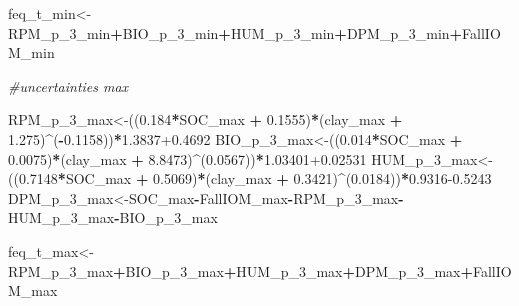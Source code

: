 \documentclass[
  10pt,
  b5paper,
]{book}
\newenvironment{Shaded}{\begin{snugshade}}{\end{snugshade}}
\newcommand{\CommentTok}[1]{\textcolor[rgb]{0.56,0.35,0.01}{\textit{#1}}}
\newcommand{\DecValTok}[1]{\textcolor[rgb]{0.00,0.00,0.81}{#1}}
\newcommand{\FloatTok}[1]{\textcolor[rgb]{0.00,0.00,0.81}{#1}}
\newcommand{\NormalTok}[1]{#1}
\newcommand{\OperatorTok}[1]{\textcolor[rgb]{0.81,0.36,0.00}{\textbf{#1}}}
\newcommand{\StringTok}[1]{\textcolor[rgb]{0.31,0.60,0.02}{#1}}
\begin{document}
\begin{Shaded}
\begin{Highlighting}[]
{\NormalTok{feq_t_min<-RPM_p_}\DecValTok{3}\NormalTok{_min}\OperatorTok{+}\NormalTok{BIO_p_}\DecValTok{3}\NormalTok{_min}\OperatorTok{+}\NormalTok{HUM_p_}\DecValTok{3}\NormalTok{_min}\OperatorTok{+}\NormalTok{DPM_p_}\DecValTok{3}\NormalTok{_min}\OperatorTok{+}\NormalTok{FallIOM_min}

\CommentTok{#uncertainties max}

\NormalTok{RPM_p_}\DecValTok{3}\NormalTok{_max<-((}\FloatTok{0.184}\OperatorTok{*}\NormalTok{SOC_max }\OperatorTok{+}\StringTok{ }\FloatTok{0.1555}\NormalTok{)}\OperatorTok{*}\NormalTok{(clay_max }\OperatorTok{+}\StringTok{ }\FloatTok{1.275}\NormalTok{)}\OperatorTok{^}\NormalTok{(}\OperatorTok{-}\FloatTok{0.1158}\NormalTok{))}\OperatorTok{*}\FloatTok{1.3837+0.4692}
\NormalTok{BIO_p_}\DecValTok{3}\NormalTok{_max<-((}\FloatTok{0.014}\OperatorTok{*}\NormalTok{SOC_max }\OperatorTok{+}\StringTok{ }\FloatTok{0.0075}\NormalTok{)}\OperatorTok{*}\NormalTok{(clay_max }\OperatorTok{+}\StringTok{ }\FloatTok{8.8473}\NormalTok{)}\OperatorTok{^}\NormalTok{(}\FloatTok{0.0567}\NormalTok{))}\OperatorTok{*}\FloatTok{1.03401+0.02531}
\NormalTok{HUM_p_}\DecValTok{3}\NormalTok{_max<-((}\FloatTok{0.7148}\OperatorTok{*}\NormalTok{SOC_max }\OperatorTok{+}\StringTok{ }\FloatTok{0.5069}\NormalTok{)}\OperatorTok{*}\NormalTok{(clay_max }\OperatorTok{+}\StringTok{ }\FloatTok{0.3421}\NormalTok{)}\OperatorTok{^}\NormalTok{(}\FloatTok{0.0184}\NormalTok{))}\OperatorTok{*}\FloatTok{0.9316-0.5243}
\NormalTok{DPM_p_}\DecValTok{3}\NormalTok{_max<-SOC_max}\OperatorTok{-}\NormalTok{FallIOM_max}\OperatorTok{-}\NormalTok{RPM_p_}\DecValTok{3}\NormalTok{_max}\OperatorTok{-}\NormalTok{HUM_p_}\DecValTok{3}\NormalTok{_max}\OperatorTok{-}\NormalTok{BIO_p_}\DecValTok{3}\NormalTok{_max}

\NormalTok{feq_t_max<-RPM_p_}\DecValTok{3}\NormalTok{_max}\OperatorTok{+}\NormalTok{BIO_p_}\DecValTok{3}\NormalTok{_max}\OperatorTok{+}\NormalTok{HUM_p_}\DecValTok{3}\NormalTok{_max}\OperatorTok{+}\NormalTok{DPM_p_}\DecValTok{3}\NormalTok{_max}\OperatorTok{+}\NormalTok{FallIOM_max}


}
\end{Highlighting}
\end{Shaded}
\end{document}
